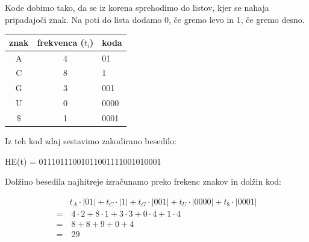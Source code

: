 \documentclass{article}
\begin{document}
\begin{enumerate}
\begin{enumerate}
			\begin{center}
			\end{center}
			
			Kode dobimo tako, da se iz korena sprehodimo do listov, kjer se nahaja pripadajoči 
			znak.  Na poti do lista dodamo 0, če gremo levo in 1, če gremo desno. 

			\begin{center}
				\begin{tabular}{c|c|l}
					znak & frekvenca ($t_i$) & koda \\
					\hline
					A & 4 & 01 \\
					C & 8 & 1 \\
					G & 3 & 001 \\
					U & 0 & 0000 \\
					\$ & 1 & 0001 \\
				\end{tabular}
			\end{center}

			Iz teh kod zdaj sestavimo zakodirano besedilo:

			\begin{center}
				HE(t) = 01110111001011001111001010001
			\end{center}

			Dolžino besedila najhitreje izračunamo preko frekenc znakov in dolžin kod:

			\begin{align*}
				& t_A \cdot |01| + t_C \cdot |1| + t_G \cdot |001| + t_U \cdot |0000| + t_{\$} \cdot |0001| \\
				=& \ 4 \cdot 2 + 8 \cdot 1 + 3 \cdot 3 + 0 \cdot 4 + 1 \cdot 4 \\
				=& \ 8 + 8 + 9 + 0 + 4 \\
				=& \ 29
			\end{align*}


\end{enumerate}
\end{enumerate}
\end{document}
